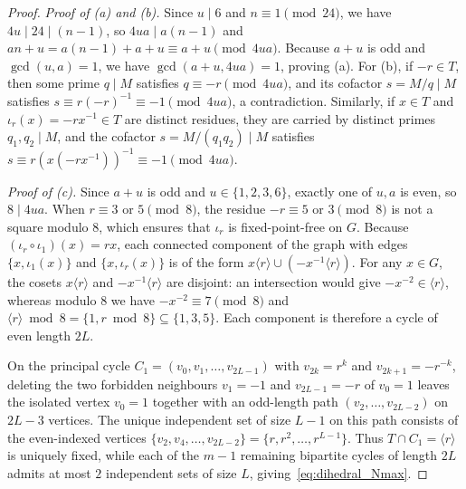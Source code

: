 \documentclass[11pt, a4paper]{article}
\theoremstyle{plain}
\theoremstyle{definition}
\begin{document}
\begin{proof}
\emph{Proof of (a) and (b).} Since $u\mid 6$ and $n\equiv1\pmod{24}$, we have $4u\mid 24\mid(n-1)$, so $4ua\mid a(n-1)$ and $an+u=a(n-1)+a+u\equiv a+u\pmod{4ua}$. Because $a+u$ is odd and $\gcd(u,a)=1$, we have $\gcd(a+u,4ua)=1$, proving (a). For (b), if $-r\in T$, then some prime $q\mid M$ satisfies $q\equiv-r\pmod{4ua}$, and its cofactor $s=M/q\mid M$ satisfies $s\equiv r(-r)^{-1}\equiv-1\pmod{4ua}$, a contradiction. Similarly, if $x\in T$ and $\iota_r(x)=-rx^{-1}\in T$ are distinct residues, they are carried by distinct primes $q_1,q_2\mid M$, and the cofactor $s=M/(q_1 q_2)\mid M$ satisfies $s\equiv r(x(-rx^{-1}))^{-1}\equiv-1\pmod{4ua}$.

\medskip\noindent\emph{Proof of (c).} Since $a+u$ is odd and $u\in\{1,2,3,6\}$, exactly one of $u,a$ is even, so $8\mid 4ua$. When $r\equiv3$ or $5\pmod 8$, the residue $-r\equiv5$ or $3\pmod 8$ is not a square modulo $8$, which ensures that $\iota_r$ is fixed-point-free on $G$. Because $(\iota_r\circ\iota_1)(x)=rx$, each connected component of the graph with edges $\{x,\iota_1(x)\}$ and $\{x,\iota_r(x)\}$ is of the form $x\langle r\rangle\cup(-x^{-1}\langle r\rangle)$. For any $x\in G$, the cosets $x\langle r\rangle$ and $-x^{-1}\langle r\rangle$ are disjoint: an intersection would give $-x^{-2}\in\langle r\rangle$, whereas modulo $8$ we have $-x^{-2}\equiv 7\pmod 8$ and $\langle r\rangle\bmod 8=\{1,r\bmod 8\}\subseteq\{1,3,5\}$. Each component is therefore a cycle of even length $2L$.

On the principal cycle $C_1=(v_0,v_1,\dots,v_{2L-1})$ with $v_{2k}=r^{k}$ and $v_{2k+1}=-r^{-k}$, deleting the two forbidden neighbours $v_1=-1$ and $v_{2L-1}=-r$ of $v_0=1$ leaves the isolated vertex $v_0=1$ together with an odd-length path $(v_2,\dots,v_{2L-2})$ on $2L-3$ vertices. The unique independent set of size $L-1$ on this path consists of the even-indexed vertices $\{v_2,v_4,\dots,v_{2L-2}\}=\{r,r^{2},\dots,r^{L-1}\}$. Thus $T\cap C_1=\langle r\rangle$ is uniquely fixed, while each of the $m-1$ remaining bipartite cycles of length $2L$ admits at most $2$ independent sets of size $L$, giving~\eqref{eq:dihedral_Nmax}.
\end{proof}
\end{document}
